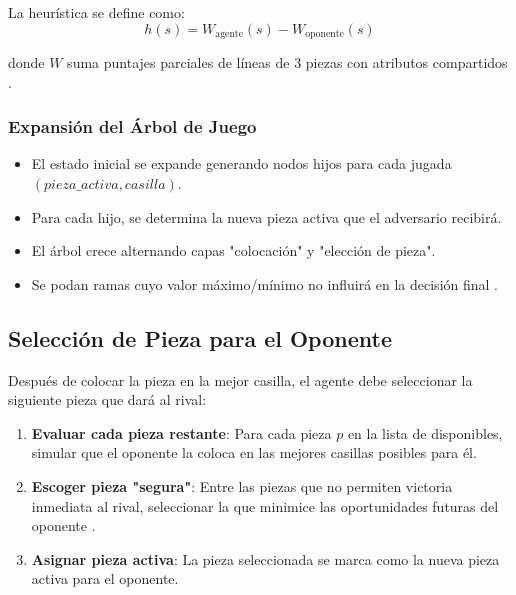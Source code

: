 \documentclass[conference]{IEEEtran}
\begin{document}
La heurística se define como:
\begin{equation}
h(s) = W_{\text{agente}}(s) - W_{\text{oponente}}(s)
\end{equation}

donde $W$ suma puntajes parciales de líneas de 3 piezas con atributos compartidos \cite{santana2012}.

\subsubsection{Expansión del Árbol de Juego}
\begin{itemize}
\item El estado inicial se expande generando nodos hijos para cada jugada $(pieza\_activa, casilla)$.
\item Para cada hijo, se determina la nueva pieza activa que el adversario recibirá.
\item El árbol crece alternando capas "colocación" y "elección de pieza".
\item Se podan ramas cuyo valor máximo/mínimo no influirá en la decisión final \cite{russell2016}.
\end{itemize}

\subsection{Selección de Pieza para el Oponente}



Después de colocar la pieza en la mejor casilla, el agente debe seleccionar la siguiente pieza que dará al rival:


\begin{enumerate}
\item \textbf{Evaluar cada pieza restante}: Para cada pieza $p$ en la lista de disponibles, simular que el oponente la coloca en las mejores casillas posibles para él.
\item \textbf{Escoger pieza "segura"}: Entre las piezas que no permiten victoria inmediata al rival, seleccionar la que minimice las oportunidades futuras del oponente \cite{santana2012}.
\item \textbf{Asignar pieza activa}: La pieza seleccionada se marca como la nueva pieza activa para el oponente.
\end{enumerate}
\end{document}
